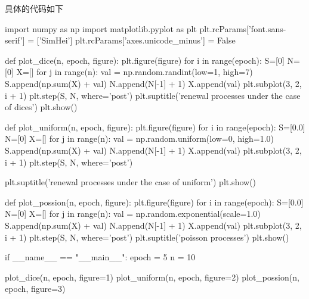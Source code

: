 \documentclass{article}
\begin{document}
具体的代码如下
    \begin{python}
import numpy as np
import matplotlib.pyplot as plt
plt.rcParams['font.sans-serif'] = ['SimHei']
plt.rcParams['axes.unicode_minus'] = False 


def plot_dice(n, epoch, figure):
    plt.figure(figure)
    for i in range(epoch):
        S=[0]
        N=[0]
        X=[]
        for j in range(n):
            val = np.random.randint(low=1, high=7)
            S.append(np.sum(X) + val)
            N.append(N[-1] + 1)
            X.append(val)
        plt.subplot(3, 2, i + 1)
        plt.step(S, N, where='post')
    plt.suptitle('renewal processes under the case of dices')
    plt.show()

def plot_uniform(n, epoch, figure):
    plt.figure(figure)
    for i in range(epoch):
        S=[0.0]
        N=[0] 
        X=[]
        for j in range(n):
            val = np.random.uniform(low=0, high=1.0)
            S.append(np.sum(X) + val)
            N.append(N[-1] + 1)
            X.append(val)
        plt.subplot(3, 2, i + 1)
        plt.step(S, N, where='post')
    
    plt.suptitle('renewal processes under the case of uniform')
    plt.show()

def plot_possion(n, epoch, figure):
    plt.figure(figure)
    for i in range(epoch):
        S=[0.0]
        N=[0]
        X=[]
        for j in range(n):
            val = np.random.exponential(scale=1.0)
            S.append(np.sum(X) + val)
            N.append(N[-1] + 1)
            X.append(val)
        plt.subplot(3, 2, i + 1)
        plt.step(S, N, where='post')
    plt.suptitle('poisson processes')
    plt.show()


if __name__ == "__main__":
    epoch = 5
    n = 10

    plot_dice(n, epoch, figure=1)
    plot_uniform(n, epoch, figure=2)
    plot_possion(n, epoch, figure=3)
    
    \end{python}
\end{document}
